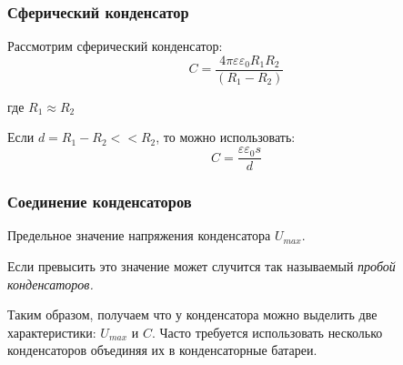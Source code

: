 \documentclass[../main.tex]{subfiles}
\begin{document}
\subsubsection{Сферический конденсатор}
Рассмотрим сферический конденсатор:
\[C = \frac{4 \pi \varepsilon \varepsilon_0 R_1 R_2}{(R_1 - R_2)}\]
\begin{center}
    где $R_1 \approx R_2$
\end{center}
Если $d = R_1 -R_2 << R_2$, то можно использовать:
\[C = \frac{\varepsilon \varepsilon_0 s}{d}\]

\subsubsection{Соединение конденсаторов}

Предельное значение напряжения конденсатора $U_{max}$.

Если превысить это значение может случится так называемый \textit{пробой конденсаторов.}

Таким образом, получаем что у конденсатора можно выделить две характеристики: $U_{max}$ и $C$. Часто требуется использовать несколько
конденсаторов объединяя их в конденсаторные батареи.

\vspace{5px}
\end{document}
